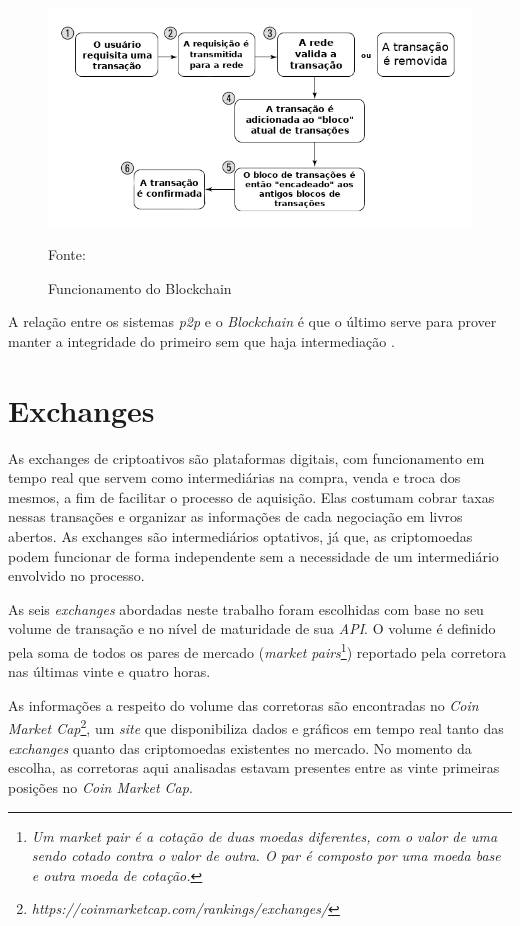 \begin{figure}[h]
	\centering
	\includegraphics[width=\textwidth]{imagens/funcionamento-blockchain.png}
	\caption{Funcionamento do Blockchain}
	Fonte: \cite{Laurence2017}
	\label{fig:funcionamento-blockchain}
\end{figure}

A relação entre os sistemas \textit{p2p} e o \textit{Blockchain} é que o último serve para prover manter a integridade do primeiro sem que haja intermediação \cite{Drescher2018}.

\section{Exchanges}

As exchanges de criptoativos são plataformas digitais, com funcionamento
em tempo real que servem como intermediárias na compra, venda e troca dos mesmos, a fim de
facilitar o processo de aquisição. Elas costumam cobrar taxas nessas transações e organizar as 
informações de cada negociação em livros abertos. As exchanges são intermediários optativos, já
que, as criptomoedas podem funcionar de forma independente sem a necessidade de um intermediário envolvido no processo.

As seis \textit{exchanges} abordadas neste trabalho foram escolhidas com base no seu volume de transação e no nível de maturidade de sua \textit{API}. O volume é definido pela soma de todos os pares de mercado (\textit{market pairs}\footnote{\em Um \textit{market pair} é a cotação de duas moedas diferentes, com o valor de uma sendo cotado contra o valor de outra. O par é composto por uma moeda base e outra moeda de cotação.}) reportado pela corretora nas últimas vinte e quatro horas.

As informações a respeito do volume das corretoras são encontradas no \textit{Coin Market Cap}\footnote{\em https://coinmarketcap.com/rankings/exchanges/}, um \textit{site} que disponibiliza dados e gráficos em tempo real tanto das \textit{exchanges} quanto das criptomoedas existentes no mercado. No momento da escolha, as corretoras aqui analisadas estavam presentes entre as vinte primeiras posições no \textit{Coin Market Cap}.


